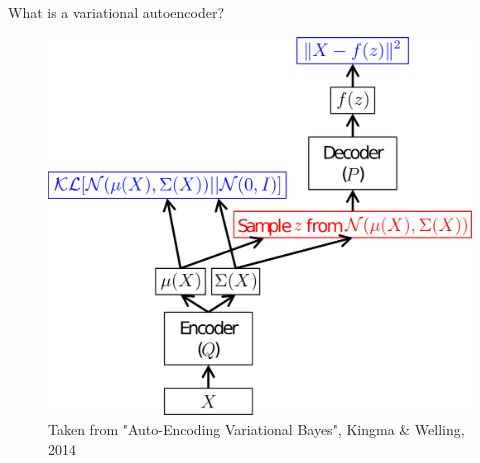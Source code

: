 \documentclass[10pt]{beamer}
\begin{document}
\begin{frame}{What is a variational autoencoder?}
	\begin{center}
            \begin{figure}
                \includegraphics[height=.8\textheight]{figs/net.png}
                \caption{Taken from "Auto-Encoding Variational Bayes", Kingma \& Welling, 2014}
            \end{figure}
	\end{center}
\end{frame}
\end{document}

